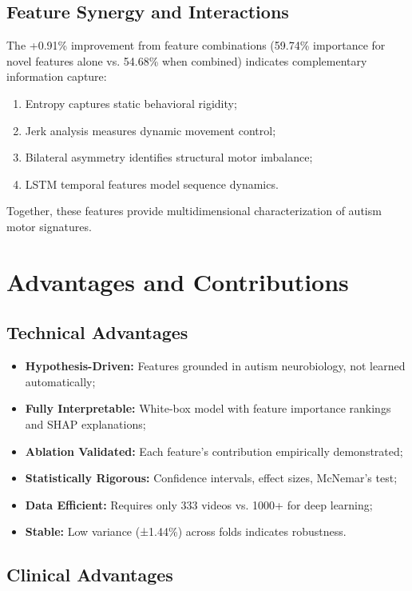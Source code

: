 \documentclass[conference]{IEEEtran}
\begin{document}
\subsection{Feature Synergy and Interactions}

The +0.91\% improvement from feature combinations (59.74\% importance for novel features alone vs. 54.68\% when combined) indicates complementary information capture:

\begin{enumerate}
\item Entropy captures static behavioral rigidity;
\item Jerk analysis measures dynamic movement control;
\item Bilateral asymmetry identifies structural motor imbalance;
\item LSTM temporal features model sequence dynamics.
\end{enumerate}

Together, these features provide multidimensional characterization of autism motor signatures.

\section{Advantages and Contributions}

\subsection{Technical Advantages}

\begin{itemize}
\item \textbf{Hypothesis-Driven:} Features grounded in autism neurobiology, not learned automatically;
\item \textbf{Fully Interpretable:} White-box model with feature importance rankings and SHAP explanations;
\item \textbf{Ablation Validated:} Each feature's contribution empirically demonstrated;
\item \textbf{Statistically Rigorous:} Confidence intervals, effect sizes, McNemar's test;
\item \textbf{Data Efficient:} Requires only 333 videos vs. 1000+ for deep learning;
\item \textbf{Stable:} Low variance (±1.44\%) across folds indicates robustness.
\end{itemize}

\subsection{Clinical Advantages}
\end{document}
